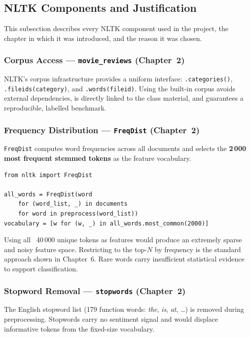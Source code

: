 \documentclass[11pt,a4paper]{article}
\begin{document}
\subsection{NLTK Components and Justification}

This subsection describes every NLTK component used in the project, the chapter in
which it was introduced, and the reason it was chosen.

\subsubsection{Corpus Access --- \texttt{movie\_reviews} (Chapter~2)}

NLTK's corpus infrastructure provides a uniform interface: \texttt{.categories()},
\texttt{.fileids(category)}, and \texttt{.words(fileid)}. Using the built-in corpus
avoids external dependencies, is directly linked to the class material, and guarantees
a reproducible, labelled benchmark.

\subsubsection{Frequency Distribution --- \texttt{FreqDist} (Chapter~2)}

\texttt{FreqDist} computes word frequencies across all documents and selects the
\textbf{2\,000 most frequent stemmed tokens} as the feature vocabulary.

\begin{lstlisting}[caption={Vocabulary selection via \texttt{FreqDist}.}]
from nltk import FreqDist

all_words = FreqDist(word
    for (word_list, _) in documents
    for word in preprocess(word_list))
vocabulary = [w for (w, _) in all_words.most_common(2000)]
\end{lstlisting}

Using all ~40\,000 unique tokens as features would produce an extremely sparse and
noisy feature space. Restricting to the top-$N$ by frequency is the standard approach
shown in Chapter~6. Rare words carry insufficient statistical evidence to support
classification.

\subsubsection{Stopword Removal --- \texttt{stopwords} (Chapter~2)}

The English stopword list (179 function words: \emph{the}, \emph{is}, \emph{at},
\ldots) is removed during preprocessing. Stopwords carry no sentiment signal and would
displace informative tokens from the fixed-size vocabulary.
\end{document}
